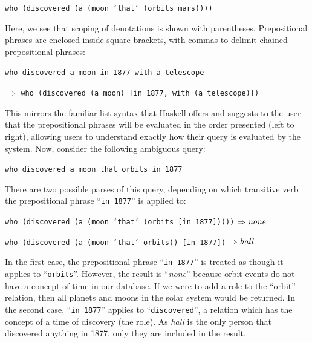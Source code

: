 \documentclass[../main.tex]{subfiles}
\begin{document}
\begin{refsection}
\examplespacing

\texttt{who (discovered (a (moon `that` (orbits mars))))}

\examplespacing

\noindent Here, we see that scoping of denotations is shown with parentheses.  Prepositional phrases are enclosed inside square brackets, with commas to delimit chained prepositional phrases:

\examplespacing

\texttt{who discovered a moon in 1877 with a telescope}

\qquad $\Rightarrow$ \texttt{who (discovered (a moon) [in 1877, with (a telescope)])}

\examplespacing

\noindent This mirrors the familiar list syntax that Haskell offers and suggests to the user that the prepositional phrases will be evaluated in the order presented (left to right), allowing users to understand exactly how their query is evaluated by the system. Now, consider the following ambiguous query:

\examplespacing

\texttt{who discovered a moon that orbits in 1877}

\examplespacing

\noindent There are two possible parses of this query, depending on which transitive verb the prepositional phrase ``\texttt{in 1877}'' is applied to:

\examplespacing

\texttt{who (discovered (a (moon `that` (orbits [in 1877]))))} $\Rightarrow \operatorname{\mathit{none}}$

\texttt{who (discovered (a (moon `that` orbits)) [in 1877])} $\Rightarrow  \operatorname{\mathit{hall}}$

\examplespacing

\noindent In the first case, the prepositional phrase ``\texttt{in 1877}'' is treated as though it applies to ``\texttt{orbits}''.  However, the result is ``\textit{none}'' because orbit events do not have a concept of time in our database.  If we were to add a  role to the ``orbit'' relation, then all planets and moons in the solar system would be returned.
In the second case, ``\texttt{in 1877}'' applies to ``\texttt{discovered}'', a relation which has the concept of a time of discovery (the  role).  As \textit{hall} is the only person that discovered anything in 1877, only they are included in the result.


\end{refsection}
\end{document}
